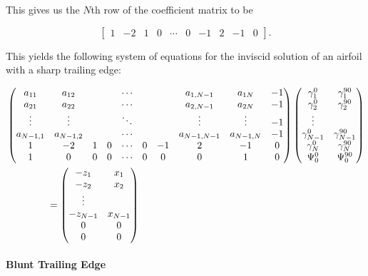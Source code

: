 \documentclass[]{article}
\begin{document}
\noindent This gives us the \(N\)th row of the coefficient matrix to be

\begin{equation}
	\begin{bmatrix}
		1 & -2 & 1 & 0 & \cdots & 0 & -1 & 2 & -1 & 0 
	\end{bmatrix}.
\end{equation}


\noindent This yields the following system of equations for the inviscid solution of an airfoil with a sharp trailing edge:

 \begin{equation}
 	\begin{split}
&	\begin{pmatrix}
		a_{11} & a_{12} & & & \cdots & & & a_{1,N-1} & a_{1N} & -1 \\
		a_{21} & a_{22} & & & \cdots & & & a_{2,N-1} & a_{2N} & -1 \\
		\vdots & \vdots & & & \ddots & & & \vdots & \vdots & -1 \\
		a_{N-1,1} & a_{N-1,2} & & & \cdots & & & a_{N-1,N-1} & a_{N-1,N} & -1 \\
		1 & -2 & 1 & 0 & \cdots & 0 & -1 & 2 & -1 & 0 \\
		1 & 0 & 0 & 0 & \cdots & 0 & 0 & 0 & 1 & 0
	\end{pmatrix}
		\begin{pmatrix}
		\gamma^0_1 & \gamma^{90}_1 \\
		\gamma^0_2 & \gamma^{90}_2 \\
		\vdots \\
		\gamma^0_{N-1} & \gamma^{90}_{N-1} \\
		\gamma^0_N & \gamma^{90}_N \\
		\Psi^0_0 & \Psi^{90}_0\\
	\end{pmatrix} \\
	& \hspace{1.5cm} =
	\begin{pmatrix}
		-z_1 & x_1 \\
		-z_2 & x_2 \\
		\vdots \\
		-z_{N-1} & x_{N-1} \\
		0 & 0 \\
		0 & 0 
	\end{pmatrix}
\end{split}
\end{equation}

\paragraph{Blunt Trailing Edge}
\end{document}
